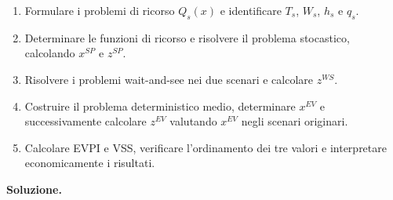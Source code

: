 \begin{exercise}
\begin{enumerate}
\item Formulare i problemi di ricorso
$Q_s(x)$ e identificare
$T_s$, $W_s$, $h_s$ e $q_s$.

\item Determinare le funzioni di ricorso
e risolvere il problema stocastico,
calcolando $x^{SP}$ e $z^{SP}$.

\item Risolvere i problemi
wait-and-see nei due scenari
e calcolare $z^{WS}$.

\item Costruire il problema deterministico
medio, determinare $x^{EV}$
e successivamente calcolare $z^{EV}$
valutando $x^{EV}$ negli scenari originari.

\item Calcolare EVPI e VSS,
verificare l'ordinamento dei tre valori
e interpretare economicamente i risultati.

\end{enumerate}

\end{exercise}

\noindent
\textbf{Soluzione.}

